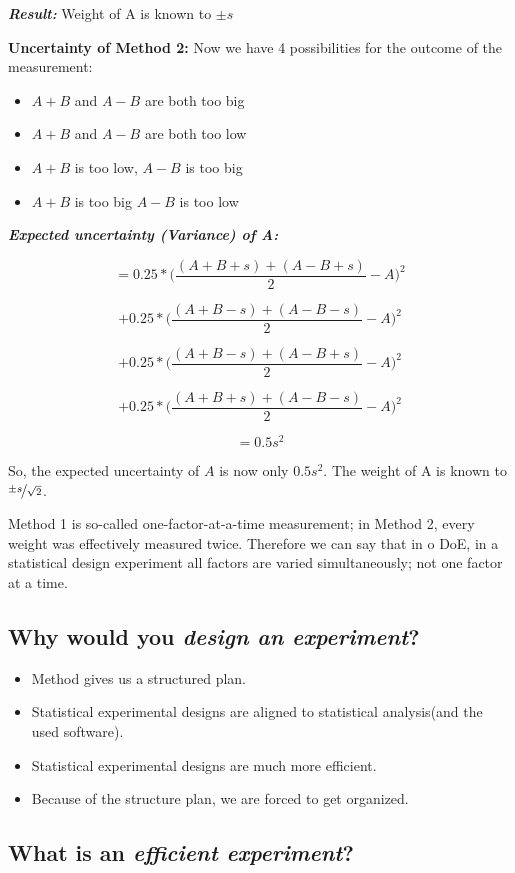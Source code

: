 \textit{\textbf{Result:}} Weight of A is known to $\pm s$

\textbf{Uncertainty of Method 2:} Now we have 4 possibilities for the outcome of the measurement:

\begin{itemize}
	\item $A+B$ and $A-B$ are both too big
	\item $A+B$ and $A-B$ are both too low
	\item $A+B$ is too low, $A-B$ is too big
	\item $A+B$ is too big $A-B$ is too low
\end{itemize}

\textit{\textbf{Expected uncertainty (Variance) of A:}}

$$ = 0.25* \bigg(\frac{(A+B+s)+(A-B+s)}{2} - A\bigg)^2 $$

$$ + 0.25* \bigg(\frac{(A+B-s)+(A-B-s)}{2} - A\bigg)^2 $$

$$ + 0.25* \bigg(\frac{(A+B-s)+(A-B+s)}{2} - A\bigg)^2 $$

$$ + 0.25* \bigg(\frac{(A+B+s)+(A-B-s)}{2} - A\bigg)^2 $$

$$ = 0.5s^2$$

So, the expected uncertainty of $A$ is now only $0.5s^2$. The weight of A is known to $\nicefrac{\pm s}{\sqrt{2}}$.

Method 1 is so-called one-factor-at-a-time measurement; in Method 2, every weight was effectively measured twice. Therefore we can say that in o DoE, in a statistical design experiment all factors are varied simultaneously; not one factor at a time.

\subsection*{Why would you \textit{design an experiment}?}

\begin{itemize}
	\item Method gives us a structured plan.
	\item Statistical experimental designs are aligned to statistical analysis(and the used software).
	\item Statistical experimental designs are much more efficient.
	\item Because of the structure plan, we are forced to get organized.
\end{itemize}

\subsection*{What is an \textit{efficient experiment}?}

